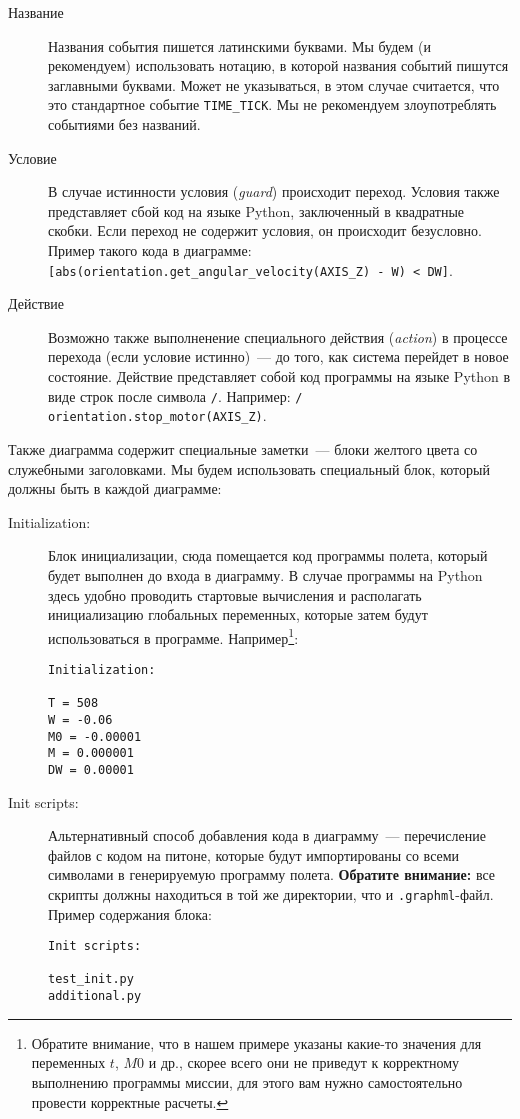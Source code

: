 \documentclass[12pt,a4paper]{article}
\begin{document}
\begin{description}
\item[Название] Названия события пишется латинскими буквами. Мы будем (и рекомендуем)
  использовать нотацию, в которой названия событий пишутся заглавными буквами. Может не
  указываться, в этом случае считается, что это стандартное событие \verb'TIME_TICK'. Мы
  не рекомендуем злоупотреблять событиями без названий.
\item[Условие] В случае истинности условия (\emph{guard}) происходит переход. Условия
  также представляет сбой код на языке Python, заключенный в квадратные скобки. Если
  переход не содержит условия, он происходит безусловно. Пример такого кода в диаграмме:
  \verb'[abs(orientation.get_angular_velocity(AXIS_Z) - W) < DW]'.
\item[Действие] Возможно также выполненение специального действия (\emph{action}) в
  процессе перехода (если условие истинно)~--- до того, как система перейдет в новое
  состояние. Действие представляет собой код программы на языке Python в виде строк после
  символа \verb'/'. Например: \verb'/ orientation.stop_motor(AXIS_Z)'.
\end{description}

Также диаграмма содержит специальные заметки~--- блоки желтого цвета со служебными
заголовками. Мы будем использовать специальный блок, который должны быть в каждой
диаграмме:

\begin{description}
\item[Initialization:] Блок инициализации, сюда помещается код программы полета,
  который будет выполнен до входа в диаграмму. В случае программы на Python здесь удобно
  проводить стартовые вычисления и располагать инициализацию глобальных переменных,
  которые затем будут использоваться в программе. Например\footnote{Обратите внимание, что в нашем
    примере указаны какие-то значения для переменных $t$, $M0$ и др., скорее всего они не
    приведут к корректному выполнению программы миссии, для этого вам нужно самостоятельно
    провести корректные расчеты.}:

\begin{verbatim}
Initialization:

T = 508
W = -0.06
M0 = -0.00001
M = 0.000001
DW = 0.00001
\end{verbatim}

\item[Init scripts:] Альтернативный способ добавления кода в диаграмму~--- перечисление
  файлов с кодом на питоне, которые будут импортированы со всеми символами в генерируемую программу
  полета. \textbf{Обратите внимание:} все скрипты должны находиться в той же директории,
  что и \verb'.graphml'-файл. Пример содержания блока:

\begin{verbatim}
Init scripts:

test_init.py
additional.py
\end{verbatim}

\end{description}
\end{document}
